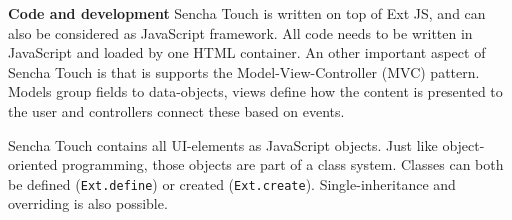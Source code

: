 \documentclass[a4paper]{artikel3}
\newcommand{\term}[1]{\emph{#1}}
\newcommand{\code}[1]{\texttt{#1}}
\renewcommand{\paragraph}[1]{{\bf #1} }
\begin{document}

\paragraph{Code and development}
Sencha Touch is written on top of Ext JS,  and can also be considered as JavaScript framework.  All code needs to be written in JavaScript and loaded by one HTML container.  An other important aspect of Sencha Touch is that is supports the Model-View-Controller (MVC) pattern.  Models group fields to data-objects,  views define how the content is presented to the user and controllers connect these based on events.
 



Sencha Touch contains all UI-elements as JavaScript objects.  Just like object-oriented programming,  those objects are part of a class system.  Classes can both be defined (\code{Ext.define}) or created (\code{Ext.create}).  Single-inheritance and overriding is also possible.    
\end{document}
